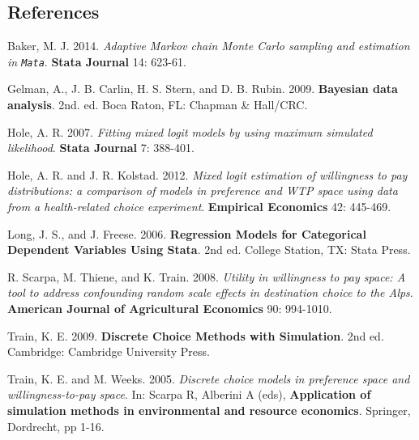 \documentclass[11pt]{article}
\begin{document}
    \hypertarget{references}{%
\subsection{References}\label{references}}

Baker, M. J. 2014. \emph{Adaptive Markov chain Monte Carlo sampling and
estimation in \texttt{Mata}}. \textbf{Stata Journal} 14: 623-61.

Gelman, A., J. B. Carlin, H. S. Stern, and D. B. Rubin. 2009.
\textbf{Bayesian data analysis}. 2nd. ed. Boca Raton, FL: Chapman \&
Hall/CRC.

Hole, A. R. 2007. \emph{Fitting mixed logit models by using maximum
simulated likelihood}. \textbf{Stata Journal} 7: 388-401.

Hole, A. R. and J. R. Kolstad. 2012. \emph{Mixed logit estimation of
willingness to pay distributions: a comparison of models in preference
and WTP space using data from a health-related choice experiment}.
\textbf{Empirical Economics} 42: 445-469.

Long, J. S., and J. Freese. 2006. \textbf{Regression Models for
Categorical Dependent Variables Using Stata}. 2nd ed. College Station,
TX: Stata Press.

R. Scarpa, M. Thiene, and K. Train. 2008. \emph{Utility in willingness
to pay space: A tool to address confounding random scale effects in
destination choice to the Alps}. \textbf{American Journal of
Agricultural Economics} 90: 994-1010.

Train, K. E. 2009. \textbf{Discrete Choice Methods with Simulation}. 2nd
ed. Cambridge: Cambridge University Press.

Train, K. E. and M. Weeks. 2005. \emph{Discrete choice models in
preference space and willingness-to-pay space}. In: Scarpa R, Alberini A
(eds), \textbf{Application of simulation methods in environmental and
resource economics}. Springer, Dordrecht, pp 1-16.


    
    
    
\end{document}
